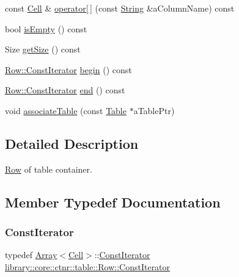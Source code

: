 \begin{DoxyCompactItemize}
\item 
const \hyperlink{namespacelibrary_1_1core_1_1ctnr_1_1table_aac6007d595b2967513e8e6b89f6092f5}{Cell} \& \hyperlink{classlibrary_1_1core_1_1ctnr_1_1table_1_1_row_a6415c3a4cfde0e2c1e85fad3f972651a}{operator\mbox{[}$\,$\mbox{]}} (const \hyperlink{classlibrary_1_1core_1_1types_1_1_string}{String} \&a\+Column\+Name) const
\item 
bool \hyperlink{classlibrary_1_1core_1_1ctnr_1_1table_1_1_row_a3edb92bce425c8eca7b470ab8517df0a}{is\+Empty} () const
\item 
Size \hyperlink{classlibrary_1_1core_1_1ctnr_1_1table_1_1_row_a5e284f42caed1acf1df7c6655d0b93e0}{get\+Size} () const
\item 
\hyperlink{classlibrary_1_1core_1_1ctnr_1_1table_1_1_row_a293725deae1bf660d85c2d3ce905cb40}{Row\+::\+Const\+Iterator} \hyperlink{classlibrary_1_1core_1_1ctnr_1_1table_1_1_row_ac95a4df6fc29ca17d567e6a4560a2e9b}{begin} () const
\item 
\hyperlink{classlibrary_1_1core_1_1ctnr_1_1table_1_1_row_a293725deae1bf660d85c2d3ce905cb40}{Row\+::\+Const\+Iterator} \hyperlink{classlibrary_1_1core_1_1ctnr_1_1table_1_1_row_af7d6f076abf692bf84d412c42c840685}{end} () const
\item 
void \hyperlink{classlibrary_1_1core_1_1ctnr_1_1table_1_1_row_a1afbb0660b89062d230da20a46ee6335}{associate\+Table} (const \hyperlink{classlibrary_1_1core_1_1ctnr_1_1_table}{Table} $\ast$a\+Table\+Ptr)
\end{DoxyCompactItemize}


\subsection{Detailed Description}
\hyperlink{classlibrary_1_1core_1_1ctnr_1_1table_1_1_row}{Row} of table container. 

\subsection{Member Typedef Documentation}
\mbox{\label{classlibrary_1_1core_1_1ctnr_1_1table_1_1_row_a293725deae1bf660d85c2d3ce905cb40}} 
\subsubsection{\texorpdfstring{Const\+Iterator}{ConstIterator}}
{\footnotesize\ttfamily typedef \hyperlink{classlibrary_1_1core_1_1ctnr_1_1_array}{Array}$<$\hyperlink{namespacelibrary_1_1core_1_1ctnr_1_1table_aac6007d595b2967513e8e6b89f6092f5}{Cell}$>$\+::\hyperlink{classlibrary_1_1core_1_1ctnr_1_1table_1_1_row_a293725deae1bf660d85c2d3ce905cb40}{Const\+Iterator} \hyperlink{classlibrary_1_1core_1_1ctnr_1_1table_1_1_row_a293725deae1bf660d85c2d3ce905cb40}{library\+::core\+::ctnr\+::table\+::\+Row\+::\+Const\+Iterator}}



